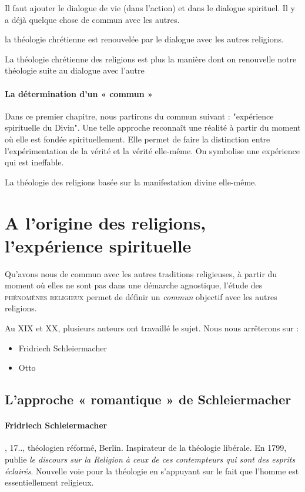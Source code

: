 \begin{rem}
Il faut ajouter le dialogue de vie (dans l'action) et dans le dialogue spirituel.  Il y a déjà quelque chose de commun avec les autres. 
\end{rem}

la théologie chrétienne est renouvelée par le dialogue avec les autres religions. 
\begin{Synthesis}
La théologie chrétienne des religions est plus la manière dont on renouvelle notre théologie suite au dialogue avec l'autre
\end{Synthesis}


\paragraph{La détermination d’un « commun » } 
Dans ce premier chapitre, nous partirons du commun suivant : "expérience spirituelle du Divin". Une telle approche reconnaît une réalité à partir du moment où elle est fondée spirituellement. 
Elle permet de faire la distinction entre l'expérimentation de la vérité et la vérité elle-même.
On symbolise une expérience qui est ineffable. 

La théologie des religions basée sur la manifestation divine elle-même.

\section{A l’origine des religions, l’expérience spirituelle}

Qu'avons nous de commun avec les autres traditions religieuses, à partir du moment où elles ne sont pas dans une démarche agnostique, l'étude des \textsc{phénomènes religieux} permet de définir un \textit{commun} objectif avec les autres religions. 

Au XIX et XX, plusieurs auteurs ont travaillé le sujet. Nous nous arrêterons sur : 
\begin{itemize}
    \item Fridriech Schleiermacher
    \item Otto
\end{itemize}

\subsection{L’approche « romantique » de Schleiermacher} 
\paragraph{Fridriech Schleiermacher}, 17.., théologien réformé, Berlin. Inspirateur de la théologie libérale. En 1799, publie \textit{le discours sur la Religion à ceux de ces contempteurs qui sont des esprits éclairés}. Nouvelle voie pour la théologie en s'appuyant sur le fait que l'homme est essentiellement religieux.

